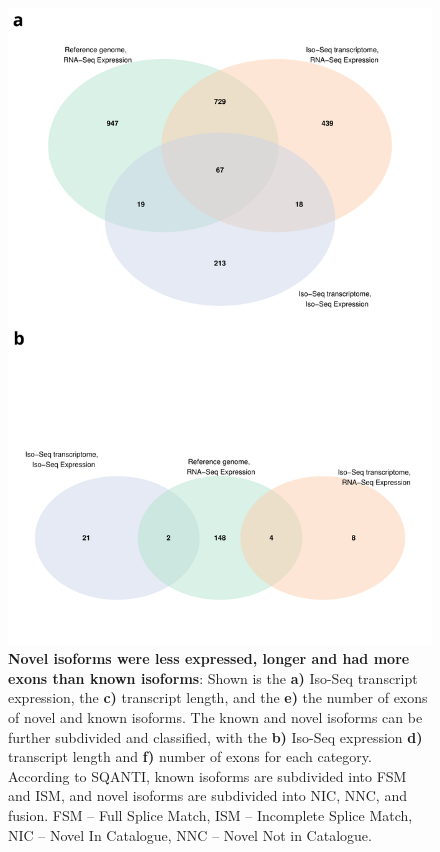 \begin{figure}[h]
	\begin{center}
		\includegraphics[page=2,scale = 0.55]{Figures/WholeDifferentialAnalysis.pdf}
	\end{center}
	\captionsetup{width=0.95\textwidth}
	\caption[Comparison of Known and Novel Isoforms from Iso-Seq Whole Transcriptome runs]%
	{\textbf{Novel isoforms were less expressed, longer and had more exons than known isoforms}: Shown is the \textbf{a)} Iso-Seq transcript expression, the \textbf{c)} transcript length, and the \textbf{e)} the number of exons of novel and known isoforms. The known and novel isoforms can be further subdivided and classified, with the \textbf{b)} Iso-Seq expression \textbf{d)} transcript length and \textbf{f)} number of exons for each category. According to SQANTI, known isoforms are subdivided into FSM and ISM, and novel isoforms are subdivided into NIC, NNC, and fusion. FSM – Full Splice Match, ISM – Incomplete Splice Match, NIC – Novel In Catalogue, NNC – Novel Not in Catalogue.}   
	\label{fig:whole_dea}
\end{figure}


